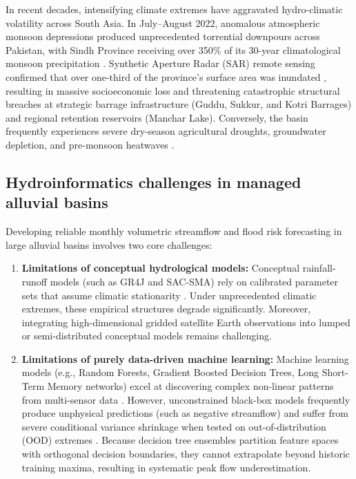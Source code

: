 \documentclass[11pt,a4paper,fleqn]{article}
\begin{document}
In recent decades, intensifying climate extremes have aggravated hydro-climatic volatility across South Asia. In July--August 2022, anomalous atmospheric monsoon depressions produced unprecedented torrential downpours across Pakistan, with Sindh Province receiving over 350\% of its 30-year climatological monsoon precipitation \citep{nanditha20232022, syed2022analysis, wwa2022pakistan}. Synthetic Aperture Radar (SAR) remote sensing confirmed that over one-third of the province's surface area was inundated \citep{tian2023satellite}, resulting in massive socioeconomic loss and threatening catastrophic structural breaches at strategic barrage infrastructure (Guddu, Sukkur, and Kotri Barrages) and regional retention reservoirs (Manchar Lake). Conversely, the basin frequently experiences severe dry-season agricultural droughts, groundwater depletion, and pre-monsoon heatwaves \citep{biemans2016future, rodell2018emerging}.

\subsection{Hydroinformatics challenges in managed alluvial basins}
Developing reliable monthly volumetric streamflow and flood risk forecasting in large alluvial basins involves two core challenges:
\begin{enumerate}
    \item \textbf{Limitations of conceptual hydrological models:} Conceptual rainfall-runoff models (such as GR4J and SAC-SMA) rely on calibrated parameter sets that assume climatic stationarity \citep{frame2022post, gupta2009decomposition, perrin2003improvement}. Under unprecedented climatic extremes, these empirical structures degrade significantly. Moreover, integrating high-dimensional gridded satellite Earth observations into lumped or semi-distributed conceptual models remains challenging.
    \item \textbf{Limitations of purely data-driven machine learning:} Machine learning models (e.g., Random Forests, Gradient Boosted Decision Trees, Long Short-Term Memory networks) excel at discovering complex non-linear patterns from multi-sensor data \citep{kratzert2018rainfall, kratzert2019towards, nearing2024global}. However, unconstrained black-box models frequently produce unphysical predictions (such as negative streamflow) and suffer from severe conditional variance shrinkage when tested on out-of-distribution (OOD) extremes \citep{jia2021physics, karpatne2017physics, read2019process}. Because decision tree ensembles partition feature spaces with orthogonal decision boundaries, they cannot extrapolate beyond historic training maxima, resulting in systematic peak flow underestimation.
\end{enumerate}
\end{document}
